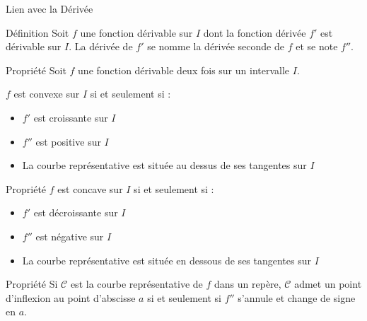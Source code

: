 \documentclass{coursbook}
\begin{document}
    \pagebreak
    \begin{Gpartie}{Lien avec la Dérivée} 
        \begin{Spartie}{Définition} 
            Soit $f$ une fonction dérivable sur $I$ dont la fonction dérivée $f'$ est dérivable sur $I$. La dérivée de $f'$ se nomme la dérivée seconde de $f$ et se note $f''$.
        \end{Spartie}
        \begin{Spartie}{Propriété} 
            Soit $f$ une fonction dérivable deux fois sur un intervalle $I$.

            $f$ est convexe sur $I$ si et seulement si :
            \begin{itemize}
                \item $f'$ est croissante sur $I$
                \item $f''$ est positive sur $I$
                \item La courbe représentative est située au dessus de ses tangentes sur $I$
            \end{itemize}
        \end{Spartie}
        \begin{Spartie}{Propriété} 
            $f$ est concave sur $I$ si et seulement si :
            \begin{itemize}
                \item $f'$ est décroissante sur $I$
                \item $f''$ est négative sur $I$
                \item La courbe représentative est située en dessous de ses tangentes sur $I$
            \end{itemize}
        \end{Spartie}
        \begin{Spartie}{Propriété} 
            Si $\mathcal{C}$ est la courbe représentative de $f$ dans un repère, $\mathcal{C}$ admet un point d'inflexion au point d'abscisse $a$ si et seulement si $f''$ s'annule et change de signe en $a$.


\end{Spartie}
\end{Gpartie}
\end{document}

